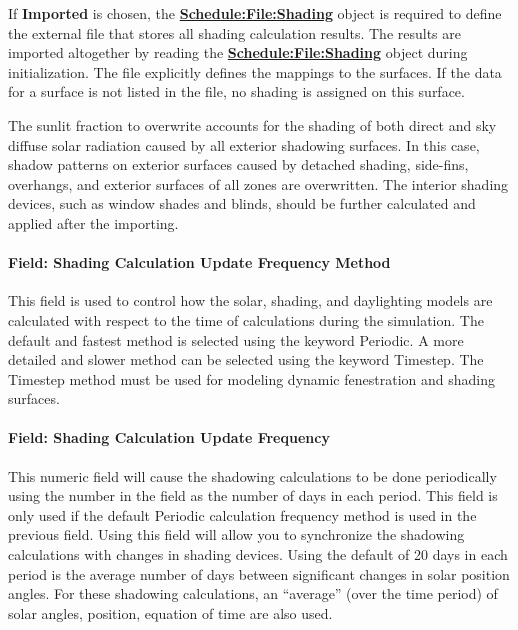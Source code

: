 If \textbf{Imported} is chosen, the \textbf{\hyperref[schedulefileshading]{Schedule:File:Shading}} object is required to define the external file that stores all shading calculation results. The results are imported altogether by reading the \textbf{\hyperref[schedulefileshading]{Schedule:File:Shading}} object during initialization. The file explicitly defines the mappings to the surfaces. If the data for a surface is not listed in the file, no shading is assigned on this surface.

The sunlit fraction to overwrite accounts for the shading of both direct and sky diffuse solar radiation caused by all exterior shadowing surfaces. In this case, shadow patterns on exterior surfaces caused by detached shading, side-fins, overhangs, and exterior surfaces of all zones are overwritten. The interior shading devices, such as window shades and blinds, should be further calculated and applied after the importing.

\paragraph{Field: Shading Calculation Update Frequency Method}\label{field-calculation-method-000}

This field is used to control how the solar, shading, and daylighting models are calculated with respect to the time of calculations during the simulation. The default and fastest method is selected using the keyword Periodic. A more detailed and slower method can be selected using the keyword Timestep. The Timestep method must be used for modeling dynamic fenestration and shading surfaces.

\paragraph{Field: Shading Calculation Update Frequency}\label{field-calculation-frequency}

This numeric field will cause the shadowing calculations to be done periodically using the number in the field as the number of days in each period. This field is only used if the default Periodic calculation frequency method is used in the previous field. Using this field will allow you to synchronize the shadowing calculations with changes in shading devices. Using the default of 20 days in each period is the average number of days between significant changes in solar position angles. For these shadowing calculations, an ``average'' (over the time period) of solar angles, position, equation of time are also used.

